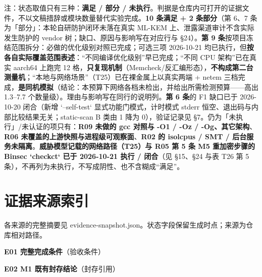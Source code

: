 \documentclass[UTF8,fontset=fandol,11pt,a4paper]{ctexart}
\begin{document}
\begin{landscape}
\begin{longtable}
\end{longtable}
\noindent 注：状态取值只有三种：\textbf{满足 / 部分 / 未执行}。判据是仓库内可打开的证据文件，不以文稿措辞或模块数量替代实验完成。\textbf{10 条满足 + 2 条部分}（第 6、7 条为「部分」：本轮自研防护闭环未落在真实 ML-KEM 上、泄露渠道审计不含实际发生防护的 vendor 树；缺口、原因与影响写在对应行与 §24）。\textbf{第 9 条}按项目冻结范围拆分：必做的优化级别对照已完成；可选三项 2026-10-21 均已执行，但\textbf{按各自实际覆盖范围表述}：“不同编译优化级别”早已完成；“不同 CPU 架构”已在真实 aarch64 上跑完 12 格，\textbf{只复现机制}（Memcheck/反汇编形态），\textbf{不构成第二台测量机}；“本地与网络场景”（T25）已在裸金属上以真实两端 + netem 三档完成，\textbf{是同机模拟}（结论：本预算下网络各档未检出，并给出所需检测预算——高出 1.3–7.7 个数量级）。理由与影响写在同行的说明列。\textbf{第 6 条}的 F1 缺口已于 2026-10-20 闭合（新增 `--self-test` 显式功能门模式，计时模式 stderr 恒空、退出码与内部比较结果无关；static-scan B 类由 1 降为 0），验证记录见 \texttt{} §7。仍为「未执行」/未认证的项只有：\textbf{R09 未做的 gcc 对照与 -O1 / -Oz / -Og、其它架构}、\textbf{R06 未覆盖的上游快照与进程级可观察面}、\textbf{R02 的 isolcpus / SMT / 后台服务未隔离}。\textbf{威胁模型记载的网络路径（T25）与 R05 第 5 条 M5 重加密步骤的 Binsec `checkct` 已于 2026-10-21 执行 / 闭合}（见 §15、§24 与表 T26 第 5 条），不再列为未执行，不写成阴性、也不含糊成“满足”。\par\endgroup\vspace{3mm}\end{landscape}
\clearpage\section*{证据来源索引}\begingroup\small\setlength{\parskip}{0.2em}
各来源的完整摘要见 evidence-snapshot.json。状态字段保留生成时点；来源为仓库相对路径。\par\vspace{2mm}
\begin{samepage}\noindent\textbf{E01 完整完成条件}（验收条件）\par\noindent {}\par\vspace{1.5mm}\end{samepage}
\begin{samepage}\noindent\textbf{E02 M1 既有封存结论}（封存引用）\par\noindent {}\par\vspace{1.5mm}\end{samepage}
\end{document}
